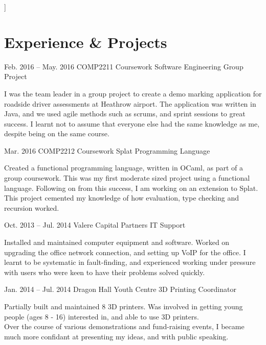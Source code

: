 \documentclass{tccv}
\begin{document}
\hline
\bigskip
]

\section{Experience \& Projects}

    \begin{eventlist}

        \item{Feb. 2016 -- May. 2016}
             {COMP2211 Coursework}
             {Software Engineering Group Project}

        I was the team leader in a group project to create a demo marking application for roadside driver assessments at Heathrow airport. The application was written in Java, and we used agile methods such as scrums, and sprint sessions to great success. I learnt not to assume that everyone else had the same knowledge as me, despite being on the same course.

        \item{Mar. 2016}
             {COMP2212 Coursework}
             {Splat Programming Language}

        Created a functional programming language, written in OCaml, as part of a group coursework. This was my first moderate sized project using a functional language. Following on from this success, I am working on an extension to Splat. This project cemented my knowledge of how evaluation, type checking and recursion worked.

        \item{Oct. 2013 -- Jul. 2014}
             {Valere Capital Partners}
             {IT Support}

        Installed and maintained computer equipment and software. Worked on upgrading the office network connection, and setting up VoIP for the office. I learnt to be systematic in fault-finding, and experienced working under pressure with users who were keen to have their problems solved quickly.\newline\newline\newline\newline

        \item{Jan. 2014 -- Jul. 2014}
             {Dragon Hall Youth Centre}
             {3D Printing Coordinator}

        Partially built and maintained 8 3D printers. Was involved in getting young people (ages 8 - 16) interested in, and able to use 3D printers.\\
        Over the course of various demonstrations and fund-raising events, I became much more confidant at presenting my ideas, and with public speaking.


\end{eventlist}
\end{document}
